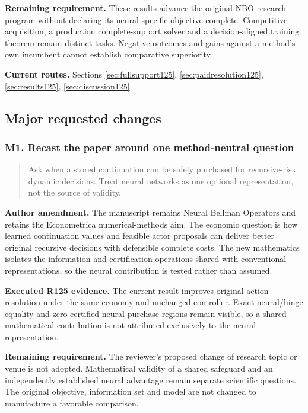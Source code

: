 \noindent\textbf{Remaining requirement.} These results advance the original NBO research program without declaring its neural-specific objective complete. Competitive acquisition, a production complete-support solver and a decision-aligned training theorem remain distinct tasks. Negative outcomes and gains against a method's own incumbent cannot establish comparative superiority.

\noindent\textbf{Current routes.} Sections \ref{sec:fullsupport125}, \ref{sec:paidresolution125}, \ref{sec:results125}, \ref{sec:discussion125}.

\subsection{Major requested changes}

\subsubsection{M1. Recast the paper around one method-neutral question}

\begin{quote}\small
Ask when a stored continuation can be safely purchased for recursive-risk dynamic decisions. Treat neural networks as one optional representation, not the source of validity.
\end{quote}

\noindent\textbf{Author amendment.} The manuscript remains Neural Bellman Operators and retains the Econometrica numerical-methods aim. The economic question is how learned continuation values and feasible actor proposals can deliver better original recursive decisions with defensible complete costs. The new mathematics isolates the information and certification operations shared with conventional representations, so the neural contribution is tested rather than assumed.

\noindent\textbf{Executed R125 evidence.} The current result improves original-action resolution under the same economy and unchanged controller. Exact neural/hinge equality and zero certified neural purchase regions remain visible, so a shared mathematical contribution is not attributed exclusively to the neural representation.

\noindent\textbf{Remaining requirement.} The reviewer's proposed change of research topic or venue is not adopted. Mathematical validity of a shared safeguard and an independently established neural advantage remain separate scientific questions. The original objective, information set and model are not changed to manufacture a favorable comparison.

